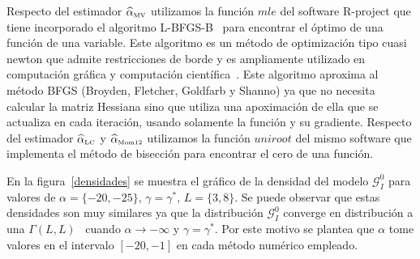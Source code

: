Respecto del estimador $\widehat{\alpha}_{{\text{\tiny{MV}}}}$ utilizamos la función $mle$ del software R-project que tiene incorporado el algoritmo L-BFGS-B~\cite{Byrd1995} para encontrar el óptimo de una función de una variable. Este algoritmo es un método de optimización tipo cuasi newton que admite restricciones de borde y es ampliamente utilizado en computación gráfica y computación científica~\cite{Fei2014}. Este algoritmo aproxima al método BFGS (Broyden, Fletcher, Goldfarb y Shanno) ya que no necesita calcular la matriz Hessiana sino que utiliza una apoximación de ella que se actualiza en cada iteración, usando solamente la función y su gradiente. 
Respecto del estimador $\widehat{\alpha}_{{\text{\tiny{LC}}}}$ y $\widehat{\alpha}_{{\text{\tiny{Mom12}}}}$ utilizamos la función $uniroot$ del mismo software que implementa el método de bisección para encontrar el cero de una función.




En la figura~\ref{densidades} se muestra el gráfico de la densidad del modelo $\mathcal{G}_I^0$ para valores de $\alpha=\{-20,-25\}$, $\gamma=\gamma^*$, $L=\{3,8\}$. Se puede observar que estas densidades son muy similares ya que la distribución $\mathcal{G}_I^0$ converge en distribución a una $\Gamma(L,L)$~\cite{Frery99} cuando $\alpha \longrightarrow -\infty$ y $\gamma=\gamma^*$. Por este motivo se plantea que $\alpha$ tome valores en el intervalo $[-20,-1]$ en cada método numérico empleado. 

